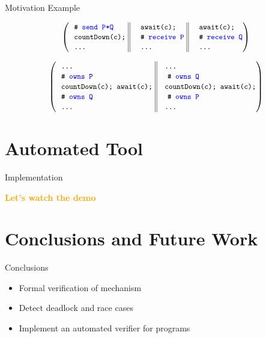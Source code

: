 \documentclass[11pt]{beamer}
\newcommand\orange[1]{\textcolor{orange}{\textbf{#1}}}
\begin{document}
\begin{frame}{Motivation Example}
\begin{center}
\[
{
\left(
\begin{tabular}{ l@{\extracolsep{\fill}} || 
                 l@{\extracolsep{\fill}} || 
                 l@{\extracolsep{\fill}} }
\BCOMMENT{\SPEC{send P*Q}} ~&~ \code{await(c);} ~&~ \code{await(c);}\\
\code{countDown(c);} ~&~ \BCOMMENT{\SPEC{receive P}} ~&~ \BCOMMENT{\SPEC{receive Q}}\\
\code{\ldots} ~&~ \code{\ldots} ~&~ \code{\ldots}\\
\end{tabular}\right)
}
\]
\end{center}


\pause

  \begin{center}
\[
{
\left(
\begin{tabular}{ l@{\extracolsep{\fill}}  || l@{\extracolsep{\fill}} }
\code{\ldots} ~&~\code{\ldots}\\
\BCOMMENT{\SPEC{owns P}} ~&~ \BCOMMENT{\SPEC{owns Q}}\\
\code{countDown(c);~await(c);} ~&~\code{countDown(c);~await(c);}\\
\BCOMMENT{\SPEC{owns Q}} ~&~ \BCOMMENT{\SPEC{owns P}}\\
\code{\ldots} ~&~\code{\ldots}\\
\end{tabular}\right)
}
\]
\end{center}
\end{frame}





\section{Automated Tool}
\begin{frame}{Implementation}
  \begin{center}
    \Large \orange{Let's watch the demo}
  \end{center}
\end{frame}

\section{Conclusions and Future Work}
\begin{frame}{Conclusions}
  \begin{itemize}
  \item Formal verification of {\CDL} mechanism
  \item Detect deadlock and race cases
  \item Implement an automated verifier for {\CDL} programs
  \end{itemize}
\end{frame}
\end{document}
